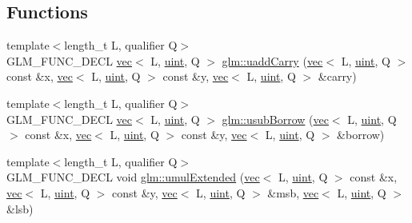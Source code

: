 \subsection*{Functions}
\begin{DoxyCompactItemize}
\item 
{\footnotesize template$<$length\+\_\+t L, qualifier Q$>$ }\\G\+L\+M\+\_\+\+F\+U\+N\+C\+\_\+\+D\+E\+CL \hyperlink{structglm_1_1vec}{vec}$<$ L, \hyperlink{group__core__precision_ga4fd29415871152bfb5abd588334147c8}{uint}, Q $>$ \hyperlink{group__core__func__integer_gaedcec48743632dff6786bcc492074b1b}{glm\+::uadd\+Carry} (\hyperlink{structglm_1_1vec}{vec}$<$ L, \hyperlink{group__core__precision_ga4fd29415871152bfb5abd588334147c8}{uint}, Q $>$ const \&x, \hyperlink{structglm_1_1vec}{vec}$<$ L, \hyperlink{group__core__precision_ga4fd29415871152bfb5abd588334147c8}{uint}, Q $>$ const \&y, \hyperlink{structglm_1_1vec}{vec}$<$ L, \hyperlink{group__core__precision_ga4fd29415871152bfb5abd588334147c8}{uint}, Q $>$ \&carry)
\item 
{\footnotesize template$<$length\+\_\+t L, qualifier Q$>$ }\\G\+L\+M\+\_\+\+F\+U\+N\+C\+\_\+\+D\+E\+CL \hyperlink{structglm_1_1vec}{vec}$<$ L, \hyperlink{group__core__precision_ga4fd29415871152bfb5abd588334147c8}{uint}, Q $>$ \hyperlink{group__core__func__integer_gae3316ba1229ad9b9f09480833321b053}{glm\+::usub\+Borrow} (\hyperlink{structglm_1_1vec}{vec}$<$ L, \hyperlink{group__core__precision_ga4fd29415871152bfb5abd588334147c8}{uint}, Q $>$ const \&x, \hyperlink{structglm_1_1vec}{vec}$<$ L, \hyperlink{group__core__precision_ga4fd29415871152bfb5abd588334147c8}{uint}, Q $>$ const \&y, \hyperlink{structglm_1_1vec}{vec}$<$ L, \hyperlink{group__core__precision_ga4fd29415871152bfb5abd588334147c8}{uint}, Q $>$ \&borrow)
\item 
{\footnotesize template$<$length\+\_\+t L, qualifier Q$>$ }\\G\+L\+M\+\_\+\+F\+U\+N\+C\+\_\+\+D\+E\+CL void \hyperlink{group__core__func__integer_ga732e2fb56db57ea541c7e5c92b7121be}{glm\+::umul\+Extended} (\hyperlink{structglm_1_1vec}{vec}$<$ L, \hyperlink{group__core__precision_ga4fd29415871152bfb5abd588334147c8}{uint}, Q $>$ const \&x, \hyperlink{structglm_1_1vec}{vec}$<$ L, \hyperlink{group__core__precision_ga4fd29415871152bfb5abd588334147c8}{uint}, Q $>$ const \&y, \hyperlink{structglm_1_1vec}{vec}$<$ L, \hyperlink{group__core__precision_ga4fd29415871152bfb5abd588334147c8}{uint}, Q $>$ \&msb, \hyperlink{structglm_1_1vec}{vec}$<$ L, \hyperlink{group__core__precision_ga4fd29415871152bfb5abd588334147c8}{uint}, Q $>$ \&lsb)

\end{DoxyCompactItemize}

